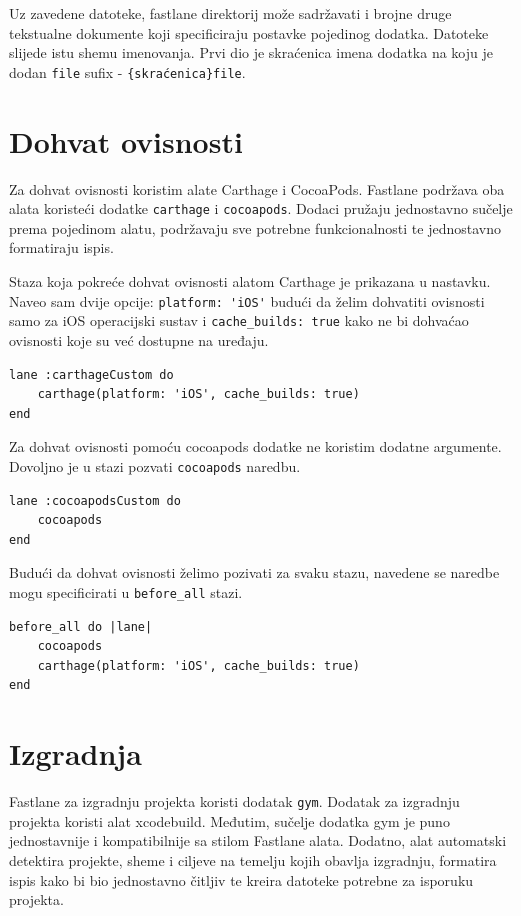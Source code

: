 \documentclass[times, utf8, diplomski, numeric]{fer}
\begin{document}
\begin{appendices}
Uz zavedene datoteke, fastlane direktorij može sadržavati i brojne druge tekstualne dokumente koji specificiraju postavke pojedinog dodatka. Datoteke slijede istu shemu imenovanja. Prvi dio je skraćenica imena dodatka na koju je dodan \verb|file| sufix - \verb|{skraćenica}file|.

\section{Dohvat ovisnosti}

Za dohvat ovisnosti koristim alate Carthage i CocoaPods. Fastlane podržava oba alata koristeći dodatke \verb|carthage| i \verb|cocoapods|. Dodaci pružaju jednostavno sučelje prema pojedinom alatu, podržavaju sve potrebne funkcionalnosti te jednostavno formatiraju ispis.

Staza koja pokreće dohvat ovisnosti alatom Carthage je prikazana u nastavku. Naveo sam dvije opcije: \verb|platform: 'iOS'| budući da želim dohvatiti ovisnosti samo za iOS operacijski sustav i \verb|cache_builds: true| kako ne bi dohvaćao ovisnosti koje su već dostupne na uređaju.

\begin{verbatim}
lane :carthageCustom do
    carthage(platform: 'iOS', cache_builds: true)
end
\end{verbatim}

Za dohvat ovisnosti pomoću cocoapods dodatke ne koristim dodatne argumente. Dovoljno je u stazi pozvati \verb|cocoapods| naredbu.

\begin{verbatim}
lane :cocoapodsCustom do
    cocoapods
end
\end{verbatim}

Budući da dohvat ovisnosti želimo pozivati za svaku stazu, navedene se naredbe mogu specificirati u \verb|before_all| stazi.

\begin{verbatim}
before_all do |lane|
    cocoapods
    carthage(platform: 'iOS', cache_builds: true)
end
\end{verbatim}

\section{Izgradnja}

Fastlane za izgradnju projekta koristi dodatak \verb|gym|. Dodatak za izgradnju projekta koristi alat xcodebuild. Međutim, sučelje dodatka gym je puno jednostavnije i kompatibilnije sa stilom Fastlane alata. Dodatno, alat automatski detektira projekte, sheme i ciljeve na temelju kojih obavlja izgradnju, formatira ispis kako bi bio jednostavno čitljiv te kreira datoteke potrebne za isporuku projekta.


\end{appendices}
\end{document}
